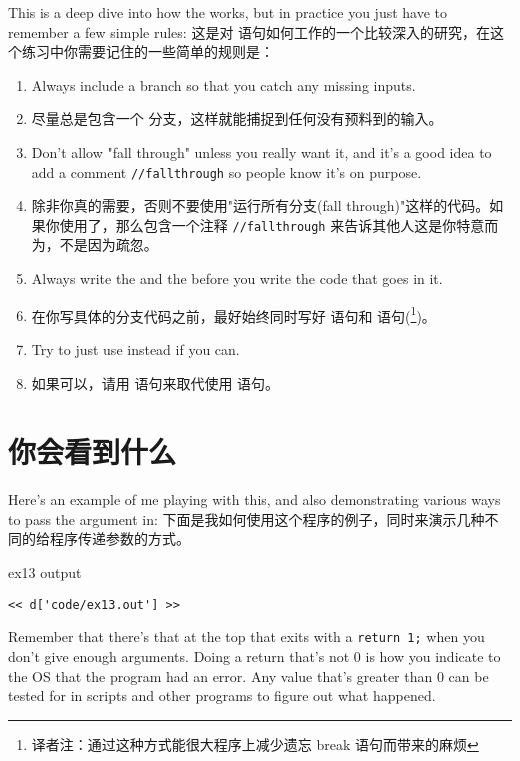 This is a deep dive into how the  works, but
in practice you just have to remember a few simple rules:
这是对  语句如何工作的一个比较深入的研究，在这个练习中你需要记住的一些简单的规则是：
\begin{enumerate}
\item Always include a  branch so that you catch
    any missing inputs.
\item 尽量总是包含一个  分支，这样就能捕捉到任何没有预料到的输入。
\item Don't allow "fall through" unless you really want it, and
    it's a good idea to add a comment \verb|//fallthrough| so 
    people know it's on purpose.
\item 除非你真的需要，否则不要使用"运行所有分支(fall through)"这样的代码。如果你使用了，那么包含一个注释 \verb|//fallthrough| 来告诉其他人这是你特意而为，不是因为疏忽。
\item Always write the  and the  before
    you write the code that goes in it.
\item 在你写具体的分支代码之前，最好始终同时写好  语句和  语句(\footnote{译者注：通过这种方式能很大程序上减少遗忘 break 语句而带来的麻烦})。
\item Try to just use  instead if you can.
\item 如果可以，请用   语句来取代使用  语句。
\end{enumerate}

\section{你会看到什么}
Here's an example of me playing with this, and also demonstrating
various ways to pass the argument in:
下面是我如何使用这个程序的例子，同时来演示几种不同的给程序传递参数的方式。
\begin{code}{ex13 output}
\begin{lstlisting}
<< d['code/ex13.out'] >>
\end{lstlisting}
\end{code}

Remember that there's that  at the top that
exits with a \verb|return 1;| when you don't give enough arguments.
Doing a return that's not 0 is how you indicate to the OS that
the program had an error.  Any value that's greater than 0 can be
tested for in scripts and other programs to figure out what
happened.

